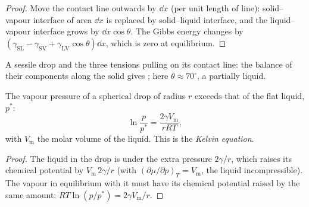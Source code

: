 \begin{proof}
Move the contact line outwards by $\dd x$ (per unit length of line): solid--vapour
interface of area $\dd x$ is replaced by solid--liquid interface, and the
liquid--vapour interface grows by $\dd x\cos\theta$. The Gibbs energy changes by
$(\gamma_{\mathrm{SL}} - \gamma_{\mathrm{SV}} + \gamma_{\mathrm{LV}}\cos\theta)\dd x$, which is zero at equilibrium.
\end{proof}

\begin{omfigure}

{\small A sessile drop and the three tensions pulling on its contact line: the
balance of their components along the solid gives ; here $\theta
\approx 70^\circ$, a partially  liquid.}
\end{omfigure}

\begin{theorem}\label{thm:b3:colloids:kelvin}
The vapour pressure of a spherical drop of radius $r$ exceeds that of the flat
liquid, $p^*$:
\[
  \ln\frac{p}{p^*} = \frac{2\gamma V_{\mathrm m}}{rRT},
\]
with $V_{\mathrm m}$ the molar volume of the liquid. This is the \emph{Kelvin
equation}.
\end{theorem}

\begin{proof}
The liquid in the drop is under the extra pressure $2\gamma/r$, which raises its
chemical potential by $V_{\mathrm m}\,2\gamma/r$ (with $(\partial\mu/\partial p)_T = V_{\mathrm m}$, the liquid incompressible).
The vapour in equilibrium with it must have its chemical potential raised by
the same amount: $RT\ln(p/p^*) = 2\gamma V_{\mathrm m}/r$.
\end{proof}

